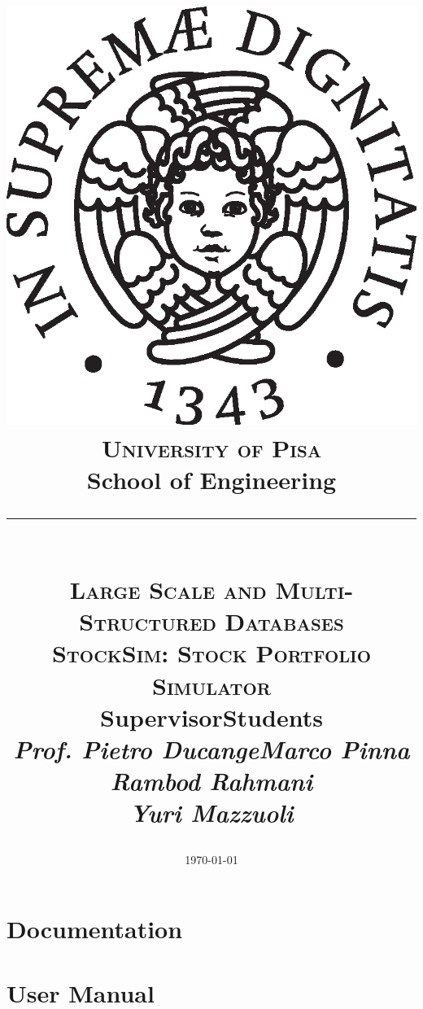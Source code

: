 \documentclass[11pt, a4paper, oneside]{book}
\title{
    \vspace{-3cm}
    \includegraphics[scale=0.3]{img/cherubino_black.eps}\\
    {\scshape University of Pisa}\\
    School of Engineering\\
    \rule{7cm}{0.01cm}\\
    {\normalsize{\scshape Large Scale and Multi-Structured Databases}}\\
    [2cm]
    {\scshape StockSim: Stock Portfolio Simulator}\\
    [3cm]
    \LARGE{\textbf{Supervisor}\hfill\textbf{Students}}\\
    \Large{\emph{Prof. Pietro Ducange}\hfill\emph{Marco Pinna\\}}
    \Large{\hfill\emph{Rambod Rahmani\\}}
    \Large{\hfill\emph{Yuri Mazzuoli\\}}
    \vfill
    \date{\today}
}
\author{}
\newcommand{\blankpage}
{
    \null
    \thispagestyle{empty}%
    \addtocounter{page}{-1}%
    \newpage
}
\begin{document}
\maketitle

\afterpage{\blankpage}	

\tableofcontents

\part{Documentation}








\part{User Manual}


\end{document}
